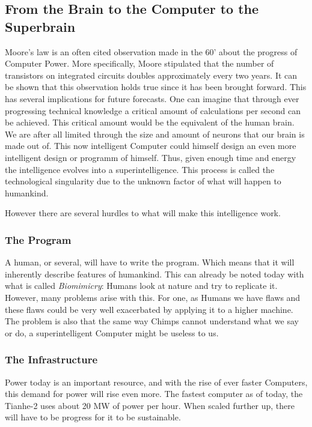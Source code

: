 \documentclass[
      12pt,
      a4paper,
      cleardoublepage=empty,
      final,
      twoside
        ]{scrbook}
\begin{document}
    \subsection{From the Brain to the Computer to the Superbrain}
      \begin{par}
        Moore's law is an often cited observation made in the 60' about the progress of Computer Power. 
        More specifically, Moore stipulated that the number of transistors on integrated circuits doubles approximately every two years. 
        It can be shown that this observation holds true since it has been brought forward.
        This has several implications for future forecasts. 
        One can imagine that through ever progressing technical knowledge a critical amount of calculations per second can be achieved.
        This critical amount would be the equivalent of the human brain.
        We are after all limited through the size and amount of neurons that our brain is made out of.
        This now intelligent Computer could himself design an even more intelligent design or programm of himself.
        Thus, given enough time and energy the intelligence evolves into a superintelligence.
        This process is called the technological singularity due to the unknown factor of what will happen to humankind.
      \end{par}
      \begin{par}
        However there are several hurdles to what will make this intelligence work.
      \end{par}
      \subsubsection{The Program}
        A human, or several, will have to write the program. 
        Which means that it will inherently describe features of humankind.
        This can already be noted today with what is called \emph{Biomimicry}: Humans look at nature and try to replicate it.
        However, many problems arise with this. 
        For one, as Humans we have flaws and these flaws could be very well exacerbated by applying it to a higher machine.
        The problem is also that the same way Chimps cannot understand what we say or do, a superintelligent Computer might be useless to us.
      \subsubsection{The Infrastructure}
        Power today is an important resource, and with the rise of ever faster Computers, this demand for power will rise even more.
        The fastest computer as of today, the Tianhe-2 uses about 20 MW of power per hour. 
        When scaled further up, there will have to be progress for it to be sustainable.
\end{document}
